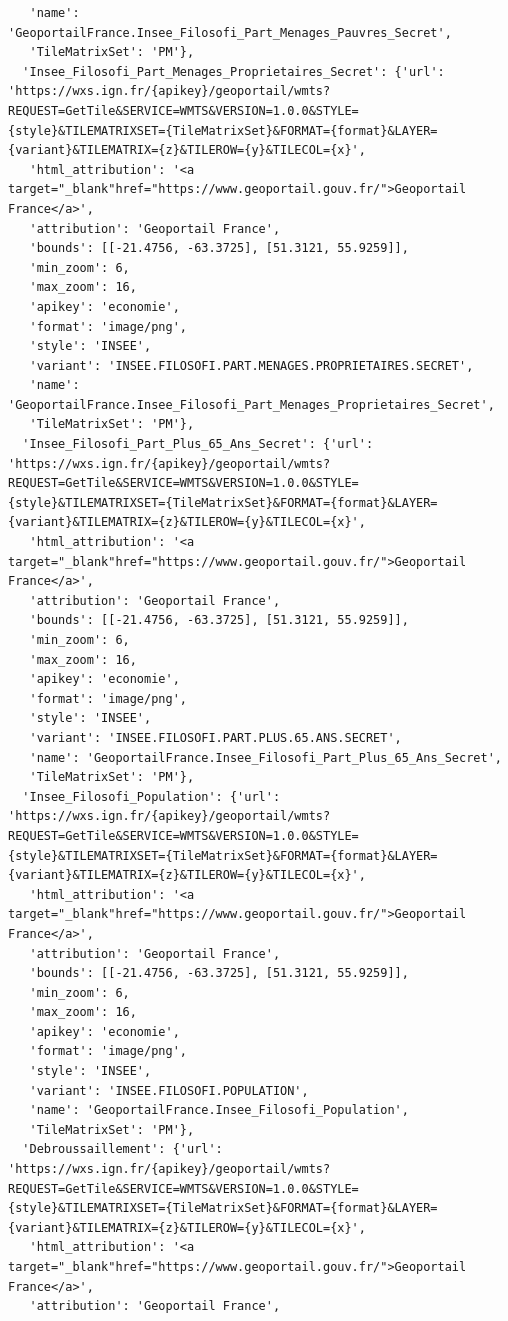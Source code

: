 \documentclass[
  letterpaper,
  DIV=11,
  numbers=noendperiod]{scrreprt}
\begin{document}
\begin{verbatim}
   'name': 'GeoportailFrance.Insee_Filosofi_Part_Menages_Pauvres_Secret',
   'TileMatrixSet': 'PM'},
  'Insee_Filosofi_Part_Menages_Proprietaires_Secret': {'url': 'https://wxs.ign.fr/{apikey}/geoportail/wmts?REQUEST=GetTile&SERVICE=WMTS&VERSION=1.0.0&STYLE={style}&TILEMATRIXSET={TileMatrixSet}&FORMAT={format}&LAYER={variant}&TILEMATRIX={z}&TILEROW={y}&TILECOL={x}',
   'html_attribution': '<a target="_blank"href="https://www.geoportail.gouv.fr/">Geoportail France</a>',
   'attribution': 'Geoportail France',
   'bounds': [[-21.4756, -63.3725], [51.3121, 55.9259]],
   'min_zoom': 6,
   'max_zoom': 16,
   'apikey': 'economie',
   'format': 'image/png',
   'style': 'INSEE',
   'variant': 'INSEE.FILOSOFI.PART.MENAGES.PROPRIETAIRES.SECRET',
   'name': 'GeoportailFrance.Insee_Filosofi_Part_Menages_Proprietaires_Secret',
   'TileMatrixSet': 'PM'},
  'Insee_Filosofi_Part_Plus_65_Ans_Secret': {'url': 'https://wxs.ign.fr/{apikey}/geoportail/wmts?REQUEST=GetTile&SERVICE=WMTS&VERSION=1.0.0&STYLE={style}&TILEMATRIXSET={TileMatrixSet}&FORMAT={format}&LAYER={variant}&TILEMATRIX={z}&TILEROW={y}&TILECOL={x}',
   'html_attribution': '<a target="_blank"href="https://www.geoportail.gouv.fr/">Geoportail France</a>',
   'attribution': 'Geoportail France',
   'bounds': [[-21.4756, -63.3725], [51.3121, 55.9259]],
   'min_zoom': 6,
   'max_zoom': 16,
   'apikey': 'economie',
   'format': 'image/png',
   'style': 'INSEE',
   'variant': 'INSEE.FILOSOFI.PART.PLUS.65.ANS.SECRET',
   'name': 'GeoportailFrance.Insee_Filosofi_Part_Plus_65_Ans_Secret',
   'TileMatrixSet': 'PM'},
  'Insee_Filosofi_Population': {'url': 'https://wxs.ign.fr/{apikey}/geoportail/wmts?REQUEST=GetTile&SERVICE=WMTS&VERSION=1.0.0&STYLE={style}&TILEMATRIXSET={TileMatrixSet}&FORMAT={format}&LAYER={variant}&TILEMATRIX={z}&TILEROW={y}&TILECOL={x}',
   'html_attribution': '<a target="_blank"href="https://www.geoportail.gouv.fr/">Geoportail France</a>',
   'attribution': 'Geoportail France',
   'bounds': [[-21.4756, -63.3725], [51.3121, 55.9259]],
   'min_zoom': 6,
   'max_zoom': 16,
   'apikey': 'economie',
   'format': 'image/png',
   'style': 'INSEE',
   'variant': 'INSEE.FILOSOFI.POPULATION',
   'name': 'GeoportailFrance.Insee_Filosofi_Population',
   'TileMatrixSet': 'PM'},
  'Debroussaillement': {'url': 'https://wxs.ign.fr/{apikey}/geoportail/wmts?REQUEST=GetTile&SERVICE=WMTS&VERSION=1.0.0&STYLE={style}&TILEMATRIXSET={TileMatrixSet}&FORMAT={format}&LAYER={variant}&TILEMATRIX={z}&TILEROW={y}&TILECOL={x}',
   'html_attribution': '<a target="_blank"href="https://www.geoportail.gouv.fr/">Geoportail France</a>',
   'attribution': 'Geoportail France',

\end{verbatim}
\end{document}
